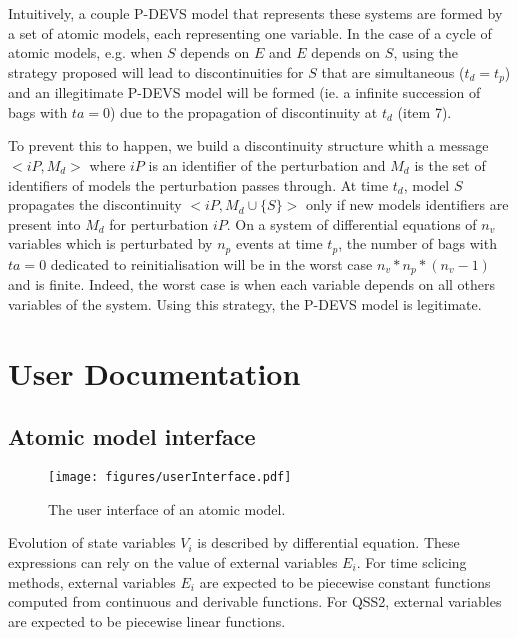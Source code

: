\documentclass{article}
\theoremstyle{remark}
\begin{document}
Intuitively, a couple P-DEVS model that represents these systems 
are formed by a set of atomic models, each representing one variable.
In the case of a cycle of atomic models, e.g. when $S$ depends on $E$ and $E$
depends on $S$, using the strategy proposed will lead to discontinuities for
$S$ that are simultaneous ($t_d = t_p$) and an illegitimate P-DEVS model
\cite{zeigler.84} will be formed (ie. a infinite succession of bags with
$ta=0$) due to the propagation of discontinuity at $t_d$ (item 7).

To prevent this to happen, we build a discontinuity structure whith a message
$<iP,M_d>$ where $iP$ is an identifier of the perturbation and 
$M_d$ is the set of identifiers of models the perturbation passes through.
At time $t_d$, model $S$ propagates the discontinuity $<iP,M_d \cup
\{S\}> $ only if new models identifiers are present into $M_d$ for perturbation
$iP$.
On a system of differential equations of $n_v$ variables which is
perturbated by $n_p$ events at time $t_p$, the number of bags with $ta=0$ dedicated 
to reinitialisation will be in the worst case $n_v *
n_p * (n_v-1)$ and is finite. Indeed, the worst case is when each variable 
depends on all others variables of the system. Using this strategy, the P-DEVS
model is legitimate.


\section{User Documentation}

\subsection{Atomic model interface}
\label{sec:user:atomic}

\begin{figure}[!h]
\begin{center} 
\texttt{[image: figures/userInterface.pdf]}
\caption{\label{fig:userInt} The user interface of an atomic model.}
\end{center}
\end{figure}

Evolution of state variables $V_i$ is described by differential equation. 
These expressions can rely on the value of external variables $E_i$.
For time sclicing methods, external variables $E_i$  are expected to be
piecewise constant functions computed from continuous and derivable functions. 
For QSS2, external variables are expected to be
piecewise linear functions.
\end{document}
